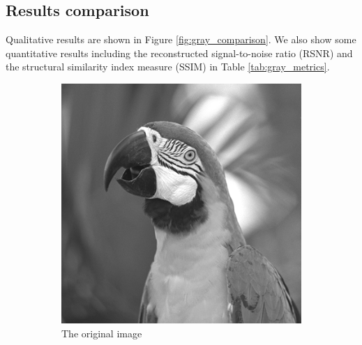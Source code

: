 \documentclass{article}
\begin{document}
\subsection*{Results comparison} \label{sec:results_gray}
Qualitative results are shown in Figure \ref{fig:gray_comparison}. We also show some quantitative results including the reconstructed signal-to-noise ratio (RSNR) and the structural similarity index measure (SSIM) in Table \ref{tab:gray_metrics}.
\begin{figure}[htbp]     
    \centering
    \begin{subfigure}[b]{0.24\textwidth}
        \centering
        \includegraphics[width=\textwidth]{../images/gray.png}
        \caption{The original image}
        \label{fig:gray}
    \end{subfigure}
    \hfill
    \begin{subfigure}[b]{0.24\textwidth}
        \centering

\end{subfigure}
\end{figure}
\end{document}

